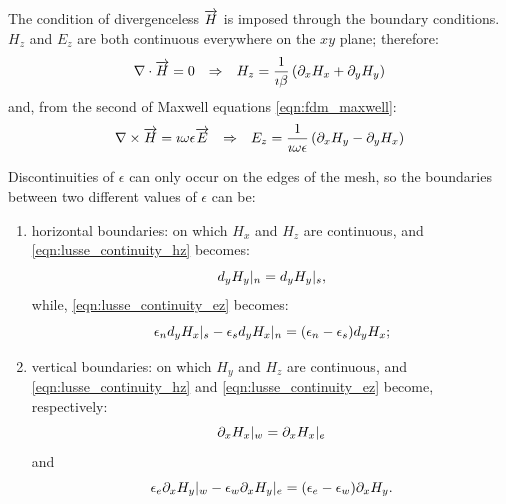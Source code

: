The condition of divergenceless $\overrightarrow{H}$ is imposed through the boundary
conditions. $H_z$ and $E_z$ are both continuous everywhere on the $xy$
plane; therefore:
\begin{align} \label{eqn:lusse_continuity_hz}
{\nabla\cdot \overrightarrow{H}} = 0 && \Rightarrow && H_z = \frac{1}{\imath \beta} \left( \partial_x H_x + \partial_y H_y \right)
\end{align}
and, from the second of Maxwell equations \eqref{eqn:fdm_maxwell}:
\begin{align} \label{eqn:lusse_continuity_ez}
  {\nabla\times \overrightarrow{H}} = \imath \omega \epsilon \overrightarrow{E} && \Rightarrow && E_z = \frac{1}{\imath \omega \epsilon} \left( \partial_x H_y - \partial_y H_x \right)
\end{align}

Discontinuities of $\epsilon$ can only occur on the edges of the
mesh, so the boundaries between two different values of $\epsilon$ can be:
\begin{enumerate}
\item
  horizontal boundaries: on which $H_x$ and $H_z$ are continuous, and
  \ref{eqn:lusse_continuity_hz} becomes:
  \begin{equation*}
    d_y H_y|_n = d_y H_y|_s,
  \end{equation*}
  while, \ref{eqn:lusse_continuity_ez} becomes:
  \begin{equation*}
    \epsilon_n d_y H_x|_s - \epsilon_s d_y H_x|_n = (\epsilon_n - \epsilon_s) d_y H_x;
  \end{equation*}
\item
  vertical boundaries: on which $H_y$ and $H_z$ are continuous, and
  \ref{eqn:lusse_continuity_hz} and \ref{eqn:lusse_continuity_ez} become,
  respectively:
  \begin{equation*}
    \partial_x H_x|_w = \partial_x H_x|_e
  \end{equation*}
  and
  \begin{equation*}
    \epsilon_e \partial_x H_y|_w - \epsilon_w \partial_x H_y|_e = (\epsilon_e - \epsilon_w) \partial_x H_y.
  \end{equation*}
\end{enumerate}

